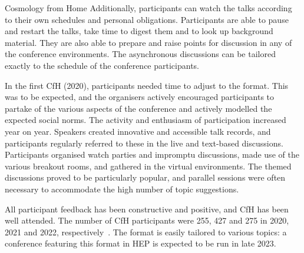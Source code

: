 \documentclass[../SustainableHEP.tex]{subfiles}
\begin{document}
\begin{casestudy}{Cosmology from Home}
Additionally, participants can watch the talks according to their own schedules and personal obligations. Participants are able to pause and restart the talks, take time to digest them and to look up background material. They are also able to prepare and raise points for discussion in any of the conference environments. The asynchronous discussions can be tailored exactly to the schedule of the conference participants.

In the first CfH (2020), participants needed time to adjust to the format. This was to be expected, and the organisers actively encouraged participants to partake of the various aspects of the conference and actively modelled the expected social norms. The activity and enthusiasm of participation increased year on year. Speakers created innovative and accessible talk records, and participants regularly referred to these in the live and text-based discussions. Participants organised watch parties and impromptu discussions, made use of the various breakout rooms, and gathered in the virtual environments. The themed discussions proved to be particularly popular, and parallel sessions were often necessary to accommodate the high number of topic suggestions.

All participant feedback has been constructive and positive, and CfH has been well attended. The number of CfH participants were 255, 427 and 275 in 2020, 2021 and 2022, respectively~\cite{CfHwebsite}.  The format is easily tailored to various topics: a conference featuring this format in HEP is expected to be run in late 2023.

\end{casestudy}
\end{document}
